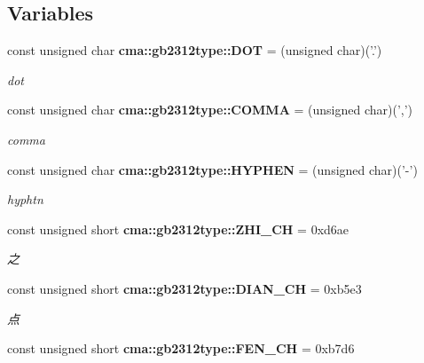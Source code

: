 \subsection*{Variables}
\begin{CompactItemize}
\item 
const unsigned char {\bf cma::gb2312type::DOT} = (unsigned char)('.')\label{namespacecma_1_1gb2312type_4c84770c03819e61f8d40adde12fe8a8}

\begin{CompactList}\small\item\em dot \item\end{CompactList}\item 
const unsigned char {\bf cma::gb2312type::COMMA} = (unsigned char)(',')\label{namespacecma_1_1gb2312type_525b45f5f2ce554f1fadf3061d1fb68a}

\begin{CompactList}\small\item\em comma \item\end{CompactList}\item 
const unsigned char {\bf cma::gb2312type::HYPHEN} = (unsigned char)('-')\label{namespacecma_1_1gb2312type_2ac4fe8f2e3b95dc8949da120084f39f}

\begin{CompactList}\small\item\em hyphtn \item\end{CompactList}\item 
const unsigned short {\bf cma::gb2312type::ZHI\_\-CH} = 0xd6ae\label{namespacecma_1_1gb2312type_121c54ca2948e4f13f7dd9e54a3b0ebe}

\begin{CompactList}\small\item\em 之 \item\end{CompactList}\item 
const unsigned short {\bf cma::gb2312type::DIAN\_\-CH} = 0xb5e3\label{namespacecma_1_1gb2312type_df2457cfcc97d3fe072d0f6ac6b4e77b}

\begin{CompactList}\small\item\em 点 \item\end{CompactList}\item 
const unsigned short {\bf cma::gb2312type::FEN\_\-CH} = 0xb7d6\label{namespacecma_1_1gb2312type_7742aecda5012381927b913f08321b58}


\end{CompactItemize}

